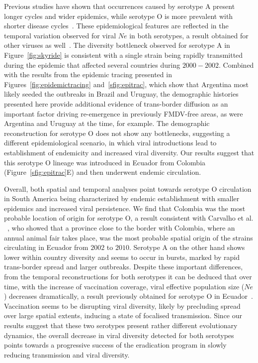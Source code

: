 \documentclass[10pt]{article}
\begin{document}
Previous studies have shown that occurrences caused by serotype A present longer cycles and wider epidemics, while serotype O is more prevalent with shorter disease cycles~\cite{colombiatime}.
These epidemiological features are reflected in the temporal variation observed for viral $Ne$ in both serotypes, a result obtained for other viruses as well~\cite{Bennett2010,Pybus2003}. 
The diversity bottleneck observed for serotype A in Figure~\ref{fig:skyride} is consistent with a single strain being rapidly transmitted during the epidemic that affected several countries during $2000-2002$.
Combined with the results from the epidemic tracing presented in Figures~\ref{fig:epidemictracing} and~\ref{sfig:epitrac}, which show that Argentina most likely seeded the outbreaks in Brazil and Uruguay, the demographic histories presented here provide additional evidence of trans-border diffusion as an important factor driving re-emergence in previously FMDV-free areas, as were Argentina and Uruguay at the time, for example.
The demographic reconstruction for serotype O does not show any bottlenecks, suggesting a different epidemiological scenario, in which viral introductions lead to establishment of endemicity and increased viral diversity.
Our results suggest that this serotype O lineage was introduced in Ecuador from Colombia (Figure~\ref{sfig:epitrac}E) and then underwent endemic circulation.

Overall, both spatial and temporal analyses point towards serotype O circulation in South America being characterized by endemic establishment with smaller epidemics and increased viral persistence. 
We find that Colombia was the most probable location of origin for serotype O, a result consistent with Carvalho et al. ~\cite{Carvalho2013}, who showed that a province close to the border with Colombia, where an annual animal fair takes place, was the most probable spatial origin of the strains circulating in Ecuador from $2002$ to $2010$.
Serotype A on the other hand shows lower within country diversity and seems to occur in bursts, marked by rapid trans-border spread and larger outbreaks. 
Despite these important differences, from the temporal reconstructions for both serotypes it can be deduced that over time, with the increase of vaccination coverage, viral effective population size ($Ne$) decreases dramatically, a result previously obtained for serotype O in Ecuador~\cite{Carvalho2013}.
Vaccination seems to be disrupting viral diversity, likely by precluding spread over large spatial extents, inducing a state of focalised transmission.
Since our results suggest that these two serotypes present rather different evolutionary dynamics, the overall decrease in viral diversity detected for both serotypes points towards a progressive success of the eradication program in slowly reducing transmission and viral diversity.
\end{document}
